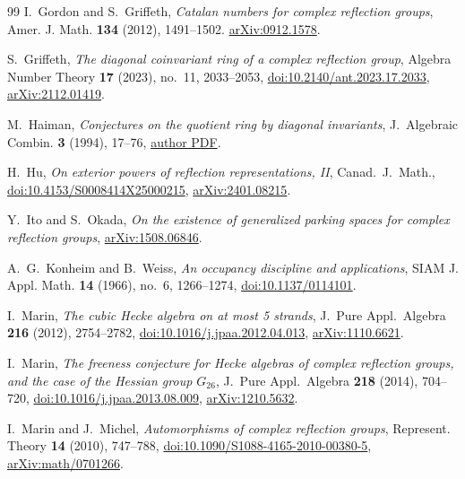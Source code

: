 \documentclass[11pt]{amsart}
\theoremstyle{definition}
\begin{document}
\begin{thebibliography}{99}
I.~Gordon and S.~Griffeth,
\emph{Catalan numbers for complex reflection groups},
Amer. J. Math. \textbf{134} (2012), 1491--1502.
\href{https://arxiv.org/abs/0912.1578}{arXiv:0912.1578}.

S.~Griffeth,
\emph{The diagonal coinvariant ring of a complex reflection group},
Algebra Number Theory \textbf{17} (2023), no.~11, 2033--2053,
\href{https://doi.org/10.2140/ant.2023.17.2033}{doi:10.2140/ant.2023.17.2033},
\href{https://arxiv.org/abs/2112.01419}{arXiv:2112.01419}.

M.~Haiman, \emph{Conjectures on the quotient ring by diagonal invariants},
J.~Algebraic Combin. \textbf{3} (1994), 17--76,
\href{https://math.berkeley.edu/~mhaiman/ftp/diagonal/diagonal.pdf}{author PDF}.

H.~Hu, \emph{On exterior powers of reflection representations, II},
Canad.~J.~Math.,
\href{https://doi.org/10.4153/S0008414X25000215}{doi:10.4153/S0008414X25000215},
\href{https://arxiv.org/abs/2401.08215}{arXiv:2401.08215}.

Y.~Ito and S.~Okada,
\emph{On the existence of generalized parking spaces for complex reflection groups},
\href{https://arxiv.org/abs/1508.06846}{arXiv:1508.06846}.

A.~G.~Konheim and B.~Weiss,
\emph{An occupancy discipline and applications},
SIAM J. Appl. Math. \textbf{14} (1966), no.~6, 1266--1274,
\href{https://doi.org/10.1137/0114101}{doi:10.1137/0114101}.

I.~Marin,
\emph{The cubic Hecke algebra on at most 5 strands},
J.~Pure Appl.~Algebra \textbf{216} (2012), 2754--2782,
\href{https://doi.org/10.1016/j.jpaa.2012.04.013}{doi:10.1016/j.jpaa.2012.04.013},
\href{https://arxiv.org/abs/1110.6621}{arXiv:1110.6621}.

I.~Marin,
\emph{The freeness conjecture for Hecke algebras of complex reflection groups,
and the case of the Hessian group $G_{26}$},
J.~Pure Appl.~Algebra \textbf{218} (2014), 704--720,
\href{https://doi.org/10.1016/j.jpaa.2013.08.009}{doi:10.1016/j.jpaa.2013.08.009},
\href{https://arxiv.org/abs/1210.5632}{arXiv:1210.5632}.

I.~Marin and J.~Michel,
\emph{Automorphisms of complex reflection groups},
Represent. Theory \textbf{14} (2010), 747--788,
\href{https://doi.org/10.1090/S1088-4165-2010-00380-5}{doi:10.1090/S1088-4165-2010-00380-5},
\href{https://arxiv.org/abs/math/0701266}{arXiv:math/0701266}.


\end{thebibliography}
\end{document}
